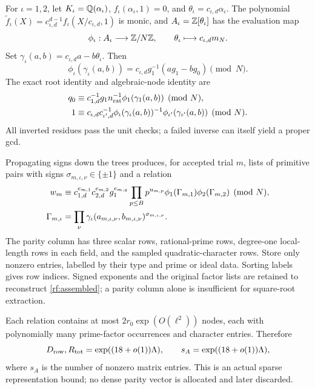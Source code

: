 For $\iota=1,2$, let $K_\iota=\mathbb Q(\alpha_\iota)$,
$f_\iota(\alpha_\iota,1)=0$, and
$\theta_\iota=c_{\iota,d}\alpha_\iota$.
The polynomial
$\widetilde f_\iota(X)=c_{\iota,d}^{d-1}
 f_\iota(X/c_{\iota,d},1)$ is monic, and
$A_\iota=\mathbb Z[\theta_\iota]$ has the evaluation map
\[
 \phi_\iota:A_\iota\longrightarrow\mathbb Z/N\mathbb Z,
 \qquad\theta_\iota\longmapsto c_{\iota,d}m_N.
\]
Set $\gamma_\iota(a,b)=c_{\iota,d}a-b\theta_\iota$.
Then
\[
 \phi_\iota(\gamma_\iota(a,b))
 =c_{\iota,d}g_1^{-1}(ag_1-bg_0)\pmod N.
\]
The exact root identity and algebraic-node identity are
\begin{align*}
 q_0&\equiv c_{1,d}^{-1}g_1n_{\rm rat}^{-1}
                     \phi_1(\gamma_1(a,b))\pmod N,\\
 1&\equiv c_{\iota,d}c_{\iota',d}^{-1}
       \phi_\iota(\gamma_\iota(a,b))^{-1}
       \phi_{\iota'}(\gamma_{\iota'}(a,b))\pmod N.
\end{align*}
All inverted residues pass the unit checks; a failed inverse can
itself yield a proper gcd.

Propagating signs down the trees produces, for accepted trial $m$,
lists of primitive pairs with signs $\sigma_{m,\iota,\nu}\in\{\pm1\}$
and a relation
\begin{align}
 w_m&\equiv c_{1,d}^{e_{m,1}}c_{2,d}^{e_{m,2}}g_1^{e_{m,g}}
       \prod_{p\le B}p^{u_{m,p}}
       \phi_1(\Gamma_{m,1})\phi_2(\Gamma_{m,2})\pmod N,
 \label{rf:assembled}\\
 \Gamma_{m,\iota}&=\prod_\nu\gamma_\iota(a_{m,\iota,\nu},b_{m,\iota,\nu})
                            ^{\sigma_{m,\iota,\nu}}.
 \notag
\end{align}
The parity column has three scalar rows, rational-prime rows,
degree-one local-length rows in each field, and the sampled
quadratic-character rows.  Store only nonzero entries, labelled by
their type and prime or ideal data.  Sorting labels gives row
indices.  Signed exponents and the original factor lists are
retained to reconstruct \eqref{rf:assembled}; a parity column
alone is insufficient for square-root extraction.

Each relation contains at most
$2r_0\exp(O(\ell^2))$ nodes, each with polynomially many
prime-factor occurrences and character entries.  Therefore
\begin{equation}
 D_{\rm row},R_{\rm tot}=\exp((18+o(1))\Lambda),\qquad
 s_A=\exp((18+o(1))\Lambda),
 \label{rf:matrixsizes}
\end{equation}
where $s_A$ is the number of nonzero matrix entries.  This is an
actual sparse representation bound; no dense parity vector is
allocated and later discarded.

